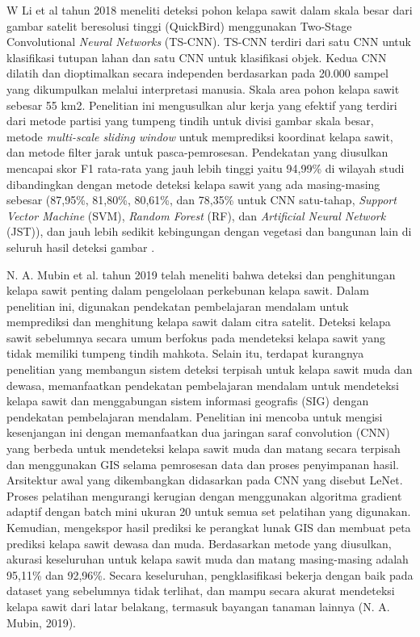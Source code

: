 W Li et al tahun 2018 meneliti deteksi pohon kelapa sawit dalam skala besar dari gambar satelit beresolusi tinggi (QuickBird) menggunakan Two-Stage Convolutional \textit{Neural Networks} (TS-CNN). TS-CNN terdiri dari satu CNN untuk klasifikasi tutupan lahan dan satu CNN untuk klasifikasi objek. Kedua CNN dilatih dan dioptimalkan secara independen berdasarkan pada 20.000 sampel yang dikumpulkan melalui interpretasi manusia. Skala area pohon kelapa sawit sebesar 55 km2. Penelitian ini mengusulkan alur kerja yang efektif yang terdiri dari metode partisi yang tumpeng tindih untuk divisi gambar skala besar, metode \textit{multi-scale sliding window} untuk memprediksi koordinat kelapa sawit, dan metode filter jarak untuk pasca-pemrosesan. Pendekatan yang diusulkan mencapai skor F1 rata-rata yang jauh lebih tinggi yaitu 94,99\% di wilayah studi dibandingkan dengan metode deteksi kelapa sawit yang ada masing-masing sebesar (87,95\%, 81,80\%, 80,61\%, dan 78,35\% untuk CNN satu-tahap, \textit{Support Vector Machine} (SVM), \textit{Random Forest} (RF), dan \textit{Artificial Neural Network} (JST)), dan jauh lebih sedikit kebingungan dengan vegetasi dan bangunan lain di seluruh hasil deteksi gambar \citep{Li2018-eb}.

N. A. Mubin et al. tahun 2019 telah meneliti bahwa deteksi dan penghitungan kelapa sawit penting dalam pengelolaan perkebunan kelapa sawit. Dalam penelitian ini, digunakan pendekatan pembelajaran mendalam untuk memprediksi dan menghitung kelapa sawit dalam citra satelit. Deteksi kelapa sawit sebelumnya secara umum berfokus pada mendeteksi kelapa sawit yang tidak memiliki tumpeng tindih mahkota. Selain itu, terdapat kurangnya penelitian yang membangun sistem deteksi terpisah untuk kelapa sawit muda dan dewasa, memanfaatkan pendekatan pembelajaran mendalam untuk mendeteksi kelapa sawit dan menggabungan sistem informasi geografis (SIG) dengan pendekatan pembelajaran mendalam. Penelitian ini mencoba untuk mengisi kesenjangan ini dengan memanfaatkan dua jaringan saraf convolution (CNN) yang berbeda untuk mendeteksi kelapa sawit muda dan matang secara terpisah dan menggunakan GIS selama pemrosesan data dan proses penyimpanan hasil. Arsitektur awal yang dikembangkan didasarkan pada CNN yang disebut LeNet. Proses pelatihan mengurangi kerugian dengan menggunakan algoritma gradient adaptif dengan batch mini ukuran 20 untuk semua set pelatihan yang digunakan. Kemudian, mengekspor hasil prediksi ke perangkat lunak GIS dan membuat peta prediksi kelapa sawit dewasa dan muda. Berdasarkan metode yang diusulkan, akurasi keseluruhan untuk kelapa sawit muda dan matang masing-masing adalah 95,11\% dan 92,96\%. Secara keseluruhan, pengklasifikasi bekerja dengan baik pada dataset yang sebelumnya tidak terlihat, dan mampu secara akurat mendeteksi kelapa sawit dari latar belakang, termasuk bayangan tanaman lainnya (N. A. Mubin, 2019). 

